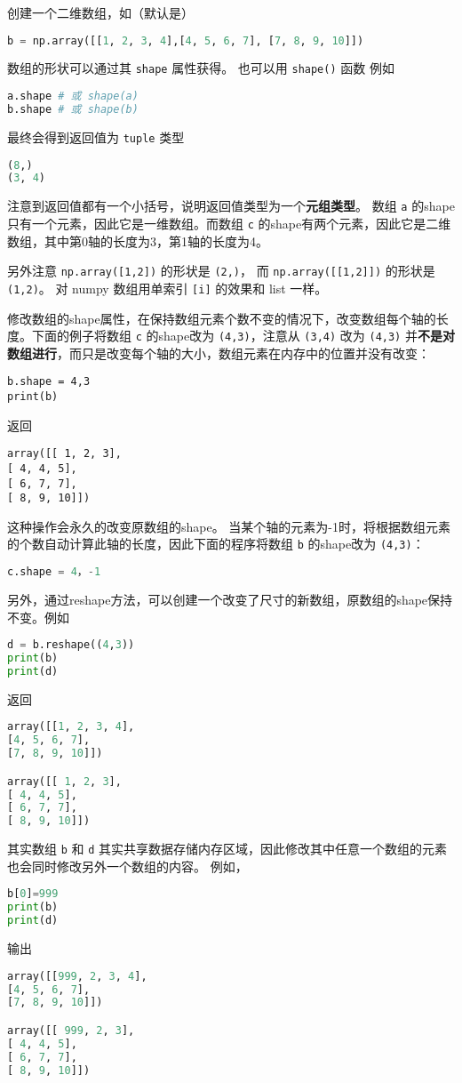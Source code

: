 创建一个二维数组，如（默认是）
\begin{lstlisting}[language=python]
b = np.array([[1, 2, 3, 4],[4, 5, 6, 7], [7, 8, 9, 10]])
\end{lstlisting}
数组的形状可以通过其 \verb`shape` 属性获得。 也可以用 \verb`shape()` 函数 例如
\begin{lstlisting}[language=python]
a.shape # 或 shape(a)
b.shape # 或 shape(b)
\end{lstlisting}
最终会得到返回值为 \verb`tuple` 类型
\begin{lstlisting}[language=python]
(8,)
(3, 4)
\end{lstlisting}
注意到返回值都有一个小括号，说明返回值类型为一个\textbf{元组类型}。 数组 \verb`a` 的shape只有一个元素，因此它是一维数组。而数组 \verb`c` 的shape有两个元素，因此它是二维数组，其中第0轴的长度为3，第1轴的长度为4。

另外注意 \verb`np.array([1,2])` 的形状是 \verb`(2,)`， 而 \verb`np.array([[1,2]])` 的形状是 \verb`(1,2)`。 对 numpy 数组用单索引 \verb`[i]` 的效果和 list 一样。

修改数组的shape属性，在保持数组元素个数不变的情况下，改变数组每个轴的长度。下面的例子将数组 \verb`c` 的shape改为 \verb`(4,3)`，注意从 \verb`(3,4)` 改为 \verb`(4,3)` 并\textbf{不是对数组进行}，而只是改变每个轴的大小，数组元素在内存中的位置并没有改变：
\begin{lstlisting}[language=none]
b.shape = 4,3
print(b)
\end{lstlisting}
返回
\begin{lstlisting}[language=none]
array([[ 1, 2, 3],
[ 4, 4, 5],
[ 6, 7, 7],
[ 8, 9, 10]])
\end{lstlisting}
这种操作会永久的改变原数组的shape。 当某个轴的元素为-1时，将根据数组元素的个数自动计算此轴的长度，因此下面的程序将数组 \verb`b` 的shape改为 \verb`(4,3)`：
\begin{lstlisting}[language=python]
c.shape = 4，-1
\end{lstlisting}
另外，通过reshape方法，可以创建一个改变了尺寸的新数组，原数组的shape保持不变。例如
\begin{lstlisting}[language=python]
d = b.reshape((4,3))
print(b)
print(d)
\end{lstlisting}
返回
\begin{lstlisting}[language=python]
array([[1, 2, 3, 4],
[4, 5, 6, 7],
[7, 8, 9, 10]])

array([[ 1, 2, 3],
[ 4, 4, 5],
[ 6, 7, 7],
[ 8, 9, 10]])
\end{lstlisting}
其实数组 \verb`b` 和 \verb`d` 其实共享数据存储内存区域，因此修改其中任意一个数组的元素也会同时修改另外一个数组的内容。 例如，
\begin{lstlisting}[language=python]
b[0]=999
print(b)
print(d)
\end{lstlisting}
输出
\begin{lstlisting}[language=python]
array([[999, 2, 3, 4],
[4, 5, 6, 7],
[7, 8, 9, 10]])

array([[ 999, 2, 3],
[ 4, 4, 5],
[ 6, 7, 7],
[ 8, 9, 10]])
\end{lstlisting}


